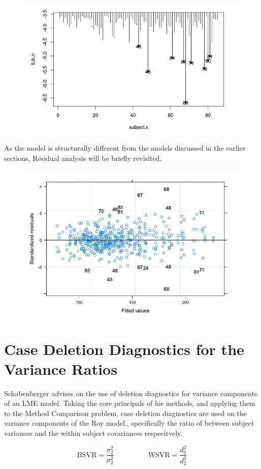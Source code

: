 \documentclass[12pt, a4paper]{report}
\theoremstyle{plain}
\theoremstyle{definition}
\theoremstyle{remark}
\begin{document}
\begin{figure}[h!]
	\centering
	\includegraphics[width=0.7\linewidth]{images/LogLik-JS-Roy}
	\caption{}
	\label{fig:LogLik-JS-Roy}
\end{figure}

As the model is structurally different from the models discussed in the earlier sections, Residual analysis will be briefly revisited.
\begin{figure}[h!]
	\centering
	\includegraphics[width=0.7\linewidth]{images/Residuals-JS-Roy}
	\caption{}
	\label{fig:Residuals-JS-Roy}
\end{figure}

\newpage
\section{Case Deletion Diagnostics for the Variance Ratios}

Schabenberger advises on the use of deletion diagnostics for variance components of an LME model.
Taking the core principals of his methods, and applying them to the Method Comparison problem, case deletion diagnostics are used on the variance components of the Roy model., specifically the ratio of between subject variances and the within subject covariances respecitvely.


\[ \mbox{BSVR} = \frac{\sigma^2_2}{\sigma^2_2} \phantom{makespace}  \mbox{WSVR} = \frac{d^2_2}{d^2_2} \]
\end{document}
